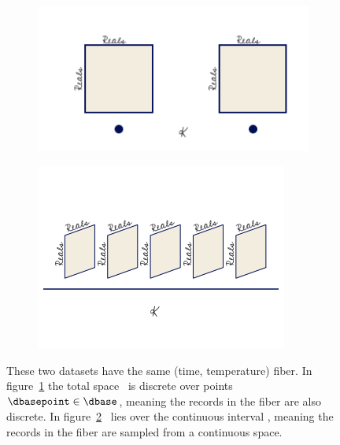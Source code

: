\documentclass[../main.tex]{subfiles}
\begin{document}
\begin{figure}[H]
    \begin{subfigure}{.5\textwidth}
        \includegraphics[width=\textwidth]{figures/math/temp_1k.png}
        \caption{}
        \label{fig:base_example_discrete}
    \end{subfigure}
    \begin{subfigure}{.5\textwidth}
        \includegraphics[width=\textwidth]{figures/math/temp_2f.png}
        \caption{}
        \label{fig:base_example_continuous}
    \end{subfigure}
    \caption{These two datasets have the same (time, temperature) fiber. In figure~\ref{fig:base_example_discrete} the total space \dtotal\ is discrete over points $\dbasepoint \in \dbase$, meaning the records in the fiber are also discrete. In figure~\ref{fig:base_example_continuous} \dtotal\ lies over the continuous interval \dbase, meaning the records in the fiber are sampled from a continuous space.} 
    \label{fig:base_example}
\end{figure}
\end{document}
